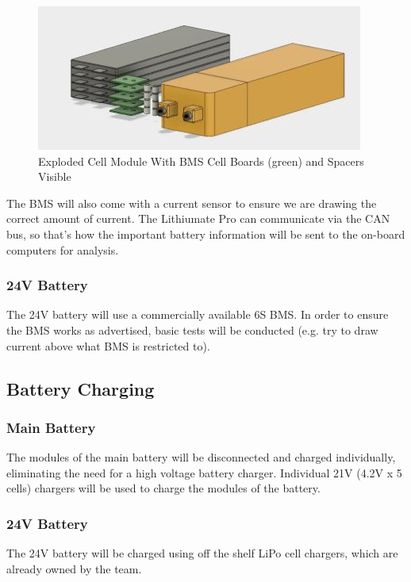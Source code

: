 \documentclass[main.tex]{subfiles}
\begin{document}
     \begin{figure}[H]
        \centering
        \includegraphics[width=\linewidth]{images/ExplodedModule}
        \caption{Exploded Cell Module With BMS Cell Boards (green) and Spacers Visible}
        \label{fig:exploded-cell}
    \end{figure}

	The BMS will also come with a current sensor to ensure we are drawing the correct amount of current.
	The Lithiumate Pro can communicate via the CAN bus, so that's how the important battery information will be sent to the on-board computers for analysis.

    \subsubsection{24V Battery}
	The 24V battery will use a commercially available 6S BMS. In order to ensure the BMS works as advertised, basic tests will be conducted (e.g. try to draw current above what BMS is restricted to).

	\subsection{Battery Charging}
    \subsubsection{Main Battery}
	The modules of the main battery will be disconnected and charged individually, eliminating the need for a high voltage battery charger. Individual 21V (4.2V x 5 cells) chargers will be used to charge the modules of the battery.
    \subsubsection{24V Battery}
    The 24V battery will be charged using off the shelf LiPo cell chargers, which are already owned by the team.
\end{document}
